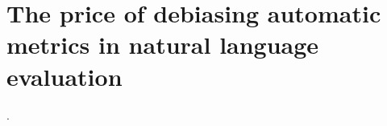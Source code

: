 \chapter[Debiasing automatic metrics]{\label{chap:price} The price of debiasing automatic metrics in natural language evaluation}

%
%

%

%    
        {\topsep}{\topsep}              %
        {\itshape}                      %
        {}                              %
        {\bfseries}                     %
        {.}                             %
        { }                             %
        {}%
    \theoremstyle{TheoremNum}
    \newtheorem{thm}{Theorem}
    \newtheorem{corl}{Corollary}
    \newtheorem{lem}{Lemma}
    \newtheorem{prop}{Proposition}
    







%




